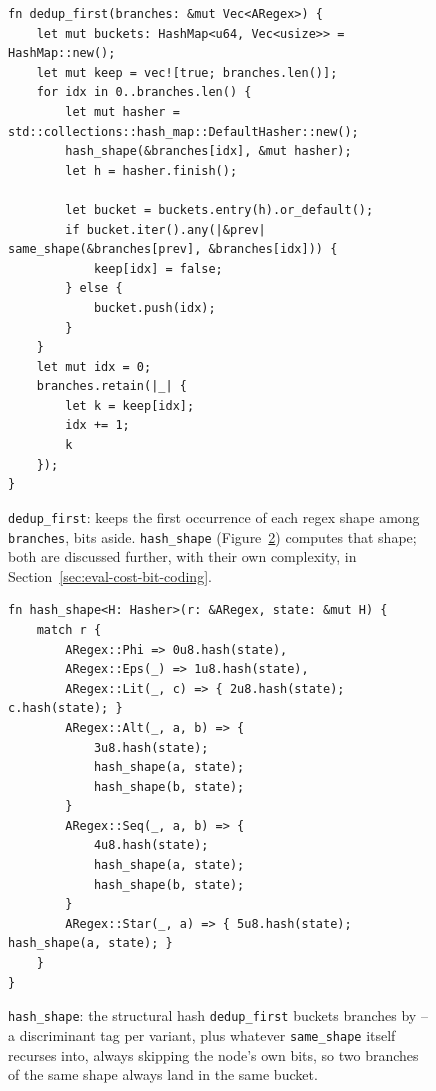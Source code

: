 \begin{figure}[H]
\small
\begin{verbatim}
fn dedup_first(branches: &mut Vec<ARegex>) {
    let mut buckets: HashMap<u64, Vec<usize>> = HashMap::new();
    let mut keep = vec![true; branches.len()];
    for idx in 0..branches.len() {
        let mut hasher = std::collections::hash_map::DefaultHasher::new();
        hash_shape(&branches[idx], &mut hasher);
        let h = hasher.finish();

        let bucket = buckets.entry(h).or_default();
        if bucket.iter().any(|&prev| same_shape(&branches[prev], &branches[idx])) {
            keep[idx] = false;
        } else {
            bucket.push(idx);
        }
    }
    let mut idx = 0;
    branches.retain(|_| {
        let k = keep[idx];
        idx += 1;
        k
    });
}
\end{verbatim}
\caption{\texttt{dedup\_first}: keeps the first occurrence of each
regex shape among \texttt{branches}, bits aside. \texttt{hash\_shape}
(Figure~\ref{fig:hash-shape-ch5-rust}) computes that shape; both are
discussed further, with their own complexity, in
Section~\ref{sec:eval-cost-bit-coding}.}
\label{fig:dedup-first-ch5-rust}
\end{figure}

\begin{figure}[H]
\small
\begin{verbatim}
fn hash_shape<H: Hasher>(r: &ARegex, state: &mut H) {
    match r {
        ARegex::Phi => 0u8.hash(state),
        ARegex::Eps(_) => 1u8.hash(state),
        ARegex::Lit(_, c) => { 2u8.hash(state); c.hash(state); }
        ARegex::Alt(_, a, b) => {
            3u8.hash(state);
            hash_shape(a, state);
            hash_shape(b, state);
        }
        ARegex::Seq(_, a, b) => {
            4u8.hash(state);
            hash_shape(a, state);
            hash_shape(b, state);
        }
        ARegex::Star(_, a) => { 5u8.hash(state); hash_shape(a, state); }
    }
}
\end{verbatim}
\caption{\texttt{hash\_shape}: the structural hash \texttt{dedup\_first}
buckets branches by -- a discriminant tag per variant, plus whatever
\texttt{same\_shape} itself recurses into, always skipping the node's
own bits, so two branches of the same shape always land in the same
bucket.}
\label{fig:hash-shape-ch5-rust}
\end{figure}

